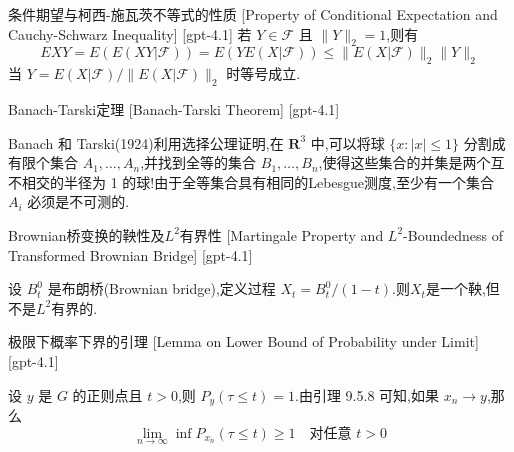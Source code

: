 \documentclass[UTF8]{ctexart}
\begin{document}
    
    
    \begin{ppt}
        {条件期望与柯西-施瓦茨不等式的性质}
        [Property of Conditional Expectation and Cauchy-Schwarz Inequality]
        [gpt-4.1]
        若 $Y \in \mathcal{F}$ 且 $\| Y \|_{2} = 1$,则有
\[
E X Y = E ( E ( X Y | \mathcal{F} ) ) = E ( Y E ( X | \mathcal{F} ) ) \leq \| E ( X | \mathcal{F} ) \|_{2} \| Y \|_{2}
\]
当 $Y = E ( X | \mathcal{F} ) / \| E ( X | \mathcal{F} ) \|_{2}$ 时等号成立.

    \end{ppt}
    
    
    
    \begin{thm}
        {Banach-Tarski定理}
        [Banach-Tarski Theorem]
        [gpt-4.1]
        
Banach 和 Tarski(1924)利用选择公理证明,在 $\mathbf{R}^{3}$ 中,可以将球 $\{ x : |x| \leq 1 \}$ 分割成有限个集合 $A_{1}, \ldots, A_{n}$,并找到全等的集合 $B_{1}, \ldots, B_{n}$,使得这些集合的并集是两个互不相交的半径为 1 的球!由于全等集合具有相同的Lebesgue测度,至少有一个集合 $A_{i}$ 必须是不可测的.

    \end{thm}
    
    
    
    \begin{thm}
        {Brownian桥变换的鞅性及$L^2$有界性}
        [Martingale Property and $L^2$-Boundedness of Transformed Brownian Bridge]
        [gpt-4.1]
        
设 $B_t^0$ 是布朗桥(Brownian bridge),定义过程 $X_t = B_t^0 / (1-t)$.则$X_t$是一个鞅,但不是$L^2$有界的.

    \end{thm}
    
    
    
    \begin{lma}
        {极限下概率下界的引理}
        [Lemma on Lower Bound of Probability under Limit]
        [gpt-4.1]
        
设 $y$ 是 $G$ 的正则点且 $t > 0$,则 $P_{y}(\tau \leq t) = 1$.由引理 9.5.8 可知,如果 $x_{n} \to y$,那么
\[
\lim_{n \to \infty} \inf P_{x_{n}}(\tau \leq t) \geq 1 \quad \text{对任意 } t > 0
\]

    \end{lma}
    
\end{document}
